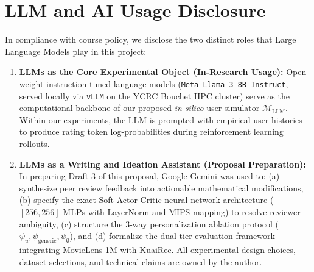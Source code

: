 \documentclass{article}
\begin{document}
\section{LLM and AI Usage Disclosure}
In compliance with course policy, we disclose the two distinct roles that Large Language Models play in this project:
\begin{enumerate}
    \item \textbf{LLMs as the Core Experimental Object (In-Research Usage):} Open-weight instruction-tuned language models (\texttt{Meta-Llama-3-8B-Instruct}, served locally via \texttt{vLLM} on the YCRC Bouchet HPC cluster) serve as the computational backbone of our proposed \textit{in silico} user simulator $\mathcal{M}_{\text{LLM}}$. Within our experiments, the LLM is prompted with empirical user histories to produce rating token log-probabilities during reinforcement learning rollouts.
    \item \textbf{LLMs as a Writing and Ideation Assistant (Proposal Preparation):} In preparing Draft 3 of this proposal, Google Gemini was used to: (a) synthesize peer review feedback into actionable mathematical modifications, (b) specify the exact Soft Actor-Critic neural network architecture ($[256, 256]$ MLPs with LayerNorm and MIPS mapping) to resolve reviewer ambiguity, (c) structure the 3-way personalization ablation protocol ($\psi_u, \psi_{\text{generic}}, \psi_{\emptyset}$), and (d) formalize the dual-tier evaluation framework integrating MovieLens-1M with KuaiRec. All experimental design choices, dataset selections, and technical claims are owned by the author.
\end{enumerate}
\end{document}
